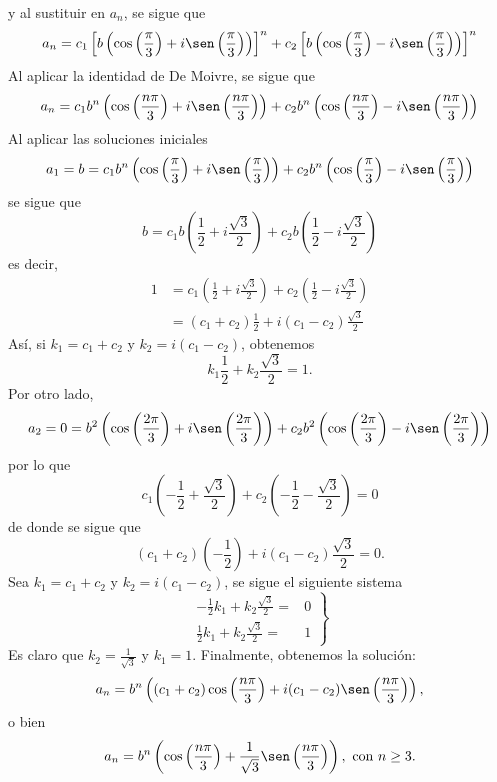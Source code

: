 \begin{myexample}
    y al sustituir en $a_n$, se sigue que
    $$a_n = c_1 \left[ b \left( \cos \left( \frac{\pi}{3} \right) + i \sen \left( \frac{\pi}{3} \right) \right) \right]^{n} + c_2 \left[ b \left( \cos \left( \frac{\pi}{3} \right) - i \sen \left( \frac{\pi}{3} \right) \right) \right]^{n}$$
    Al aplicar la identidad de De Moivre, se sigue que
    $$a_n = c_1 b^{n} \left( \cos \left( \frac{n\pi}{3} \right) + i \sen \left( \frac{n\pi}{3} \right) \right) + c_2 b^{n} \left( \cos \left( \frac{n\pi}{3} \right) - i \sen \left( \frac{n\pi}{3} \right) \right)$$
    Al aplicar las soluciones iniciales
    $$a_1 = b = c_1 b^{n} \left( \cos \left( \frac{\pi}{3} \right) + i \sen \left( \frac{\pi}{3} \right) \right) + c_2 b^{n} \left( \cos \left( \frac{\pi}{3} \right) - i \sen \left( \frac{\pi}{3} \right) \right)$$
    se sigue que
    $$b = c_1 b \left( \frac{1}{2} + i \frac{\sqrt{3}}{2} \right) + c_2 b \left( \frac{1}{2} - i \frac{\sqrt{3}}{2} \right)$$
    es decir,
    \begin{align*}
        1 & = c_1 \left( \frac{1}{2} + i \frac{\sqrt{3}}{2} \right) + c_2 \left( \frac{1}{2} - i \frac{\sqrt{3}}{2} \right) \\
        & = (c_1 + c_2) \frac{1}{2} + i (c_1 - c_2) \frac{\sqrt{3}}{2}
    \end{align*}
    Así, si $k_1 = c_1 + c_2$ y $k_2 = i(c_1 - c_2)$, obtenemos
    $$k_1 \frac{1}{2} + k_2 \frac{\sqrt{3}}{2} = 1.$$
    Por otro lado,
    $$a_2 = 0 = b^{2} \left( \cos \left( \frac{2\pi}{3} \right) + i \sen \left( \frac{2\pi}{3} \right) \right) + c_2 b^{2} \left( \cos \left( \frac{2\pi}{3} \right) - i \sen \left( \frac{2\pi}{3} \right) \right)$$
    por lo que
    $$c_1 \left( - \frac{1}{2} + \frac{\sqrt{3}}{2} \right) + c_2 \left( - \frac{1}{2} - \frac{\sqrt{3}}{2} \right) = 0$$
    de donde se sigue que
    $$(c_1 + c_2) \left( - \frac{1}{2} \right) + i (c_1 - c_2) \frac{\sqrt{3}}{2} = 0.$$
    Sea $k_1 = c_1 + c_2$ y $k_2 = i(c_1 - c_2)$, se sigue el siguiente sistema
    $$\left. \begin{array}{rl}
        \displaystyle - \frac{1}{2} k_1 + k_2 \frac{\sqrt{3}}{2} = & \!\!\!\! 0 \\[2mm]
        \displaystyle \frac{1}{2}k_1 + k_2 \frac{\sqrt{3}}{2} = & \!\!\!\! 1
    \end{array} \right\}$$
    Es claro que $\displaystyle k_2 = \frac{1}{\sqrt{3}}$ y $k_1 = 1$. Finalmente, obtenemos la solución:
    $$a_n = b^{n} \left( (c_1 + c_2) \cos \left( \frac{n\pi}{3} \right) + i(c_1 - c_2) \sen \left( \frac{n\pi}{3} \right) \right),$$
    o bien
    $$a_n = b^{n} \left( \cos \left( \frac{n\pi}{3} \right) + \frac{1}{\sqrt{3}} \sen \left( \frac{n\pi}{3} \right) \right), \text{ con } n \geq 3.$$
\end{myexample}

